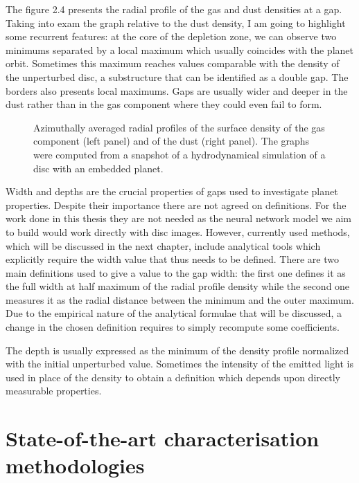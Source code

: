 \documentclass[a4paper,10pt]{report}
\begin{document}
The figure 2.4 presents the radial profile of the gas and dust densities at a gap. Taking into exam 
the graph relative to the dust density, I am going to highlight some recurrent features:
at the core of the depletion zone, we can observe two minimums separated by a local maximum which usually coincides with the planet orbit.
Sometimes this maximum reaches values comparable with the density of the unperturbed disc, a substructure that can be identified as a double gap. 
The borders also presents local maximums. Gaps are usually wider and deeper in the dust rather than in the gas component where they could even
fail to form.

\begin{figure}
    \begin{center}
        
    \end{center}
    \caption{Azimuthally averaged radial profiles of the surface density of the gas component (left panel)
    and of the dust (right panel). The graphs were computed from a snapshot of a hydrodynamical
    simulation of a disc with an embedded planet.}
\end{figure}

Width and depths are the crucial properties of gaps used to investigate planet properties. Despite their importance there are not agreed on definitions.
For the work done in this thesis they are not needed as the neural network model we aim to build would work directly with disc images.
However, currently used methods, which will be discussed in the next chapter, include analytical tools which explicitly require the width
value that thus needs to be defined.
There are two main definitions used to give a value to the gap width: the first one defines it as the full width at half maximum of the radial profile density while
the second one measures it as the radial distance between the minimum and the outer maximum.
Due to the empirical nature of the analytical formulae that will be discussed, a change in the chosen definition requires to simply recompute
some coefficients.                                        

The depth is usually expressed as the minimum of the density profile normalized with the initial unperturbed value. Sometimes the intensity of the emitted light is used in place of the
density to obtain a definition which depends upon directly measurable properties.

\chapter{State-of-the-art characterisation methodologies}
\end{document}
